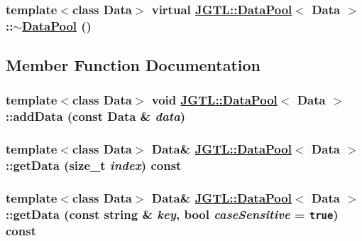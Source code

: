 \hypertarget{class_j_g_t_l_1_1_data_pool_11db34789e06fa0adf25c904e7797242}{
\subsubsection[$\sim$DataPool]{\setlength{\rightskip}{0pt plus 5cm}template$<$class Data$>$ virtual \hyperlink{class_j_g_t_l_1_1_data_pool}{JGTL::Data\-Pool}$<$ Data $>$::$\sim$\hyperlink{class_j_g_t_l_1_1_data_pool}{Data\-Pool} ()}}
\label{class_j_g_t_l_1_1_data_pool_11db34789e06fa0adf25c904e7797242}




\subsection{Member Function Documentation}
\hypertarget{class_j_g_t_l_1_1_data_pool_8a1ee540cad394f557250cf68d1a54d5}{
\subsubsection[addData]{\setlength{\rightskip}{0pt plus 5cm}template$<$class Data$>$ void \hyperlink{class_j_g_t_l_1_1_data_pool}{JGTL::Data\-Pool}$<$ Data $>$::add\-Data (const Data \& {\em data})}}
\label{class_j_g_t_l_1_1_data_pool_8a1ee540cad394f557250cf68d1a54d5}


\hypertarget{class_j_g_t_l_1_1_data_pool_6724b45cf27d9c1031dbbcc83bc0e24e}{
\subsubsection[getData]{\setlength{\rightskip}{0pt plus 5cm}template$<$class Data$>$ Data\& \hyperlink{class_j_g_t_l_1_1_data_pool}{JGTL::Data\-Pool}$<$ Data $>$::get\-Data (size\_\-t {\em index}) const}}
\label{class_j_g_t_l_1_1_data_pool_6724b45cf27d9c1031dbbcc83bc0e24e}


\hypertarget{class_j_g_t_l_1_1_data_pool_b45c619a2a490bc75cb3f558eb385210}{
\subsubsection[getData]{\setlength{\rightskip}{0pt plus 5cm}template$<$class Data$>$ Data\& \hyperlink{class_j_g_t_l_1_1_data_pool}{JGTL::Data\-Pool}$<$ Data $>$::get\-Data (const string \& {\em key}, bool {\em case\-Sensitive} = {\tt true}) const}}
\label{class_j_g_t_l_1_1_data_pool_b45c619a2a490bc75cb3f558eb385210}


